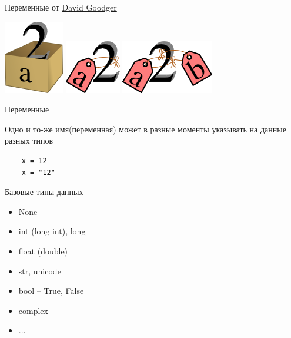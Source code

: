 \documentclass{article}
\begin{document}
\begin{center} Переменные от 
\href{http://python.net/~goodger/projects/pycon/2007/idiomatic/handout.html}{David Goodger}
\end{center}
\includegraphics{images/a2box.png} \hspace{3cm}
\includegraphics{images/a2tag.png} \hspace{3cm}
\includegraphics{images/ab2tag.png} \\
\newpage

\begin{center} Переменные \end{center}
Одно и то-же имя(переменная) может в разные моменты указывать на данные разных типов
\vspace{15pt}
\begin{lstlisting}
	x = 12
	x = "12"
\end{lstlisting}
\newpage

\begin{center} Базовые типы данных \end{center}
\begin{itemize}
	\item None
	\item int (long int), long
	\item float (double)
	\item str, unicode
	\item bool – True, False
	\item complex
	\item ...
\end{itemize}
\newpage
\end{document}
